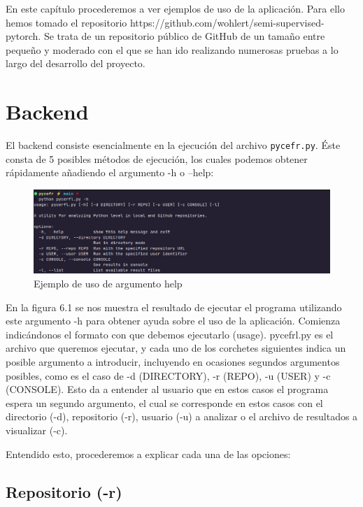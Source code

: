 \documentclass[a4paper, 12pt]{book}
\begin{document}
En este capítulo procederemos a ver ejemplos de uso de la aplicación. Para ello hemos tomado el repositorio https://github.com/wohlert/semi-supervised-pytorch. Se trata de un repositorio público de GitHub de un tamaño entre pequeño y moderado con el que se han ido realizando numerosas pruebas a lo largo del desarrollo del proyecto.

\section{Backend}

El backend consiste esencialmente en la ejecución del archivo \texttt{pycefr.py}. Éste consta de 5 posibles métodos de ejecución, los cuales podemos obtener rápidamente añadiendo el argumento -h o --help:

\vspace{2em}
\begin{figure}[htbp]
    \centering
    \includegraphics[width=\textwidth, keepaspectratio]{img/results/backend_exe_h.png}
    \caption{Ejemplo de uso de argumento help}
    \label{fig:analysis_help}
\end{figure}

En la figura 6.1 se nos muestra el resultado de ejecutar el programa utilizando este argumento -h para obtener ayuda sobre el uso de la aplicación. Comienza indicándonos el formato con que debemos ejecutarlo (usage). pycefrl.py es el archivo que queremos ejecutar, y cada uno de los corchetes siguientes indica un posible argumento a introducir, incluyendo en ocasiones segundos argumentos posibles, como es el caso de -d (DIRECTORY), -r (REPO), -u (USER) y -c (CONSOLE). Esto da a entender al usuario que en estos casos el programa espera un segundo argumento, el cual se corresponde en estos casos con el directorio (-d), repositorio (-r), usuario (-u) a analizar o el archivo de resultados a visualizar (-c).

Entendido esto, procederemos a explicar cada una de las opciones:

\subsection{Repositorio (-r)}
\end{document}
